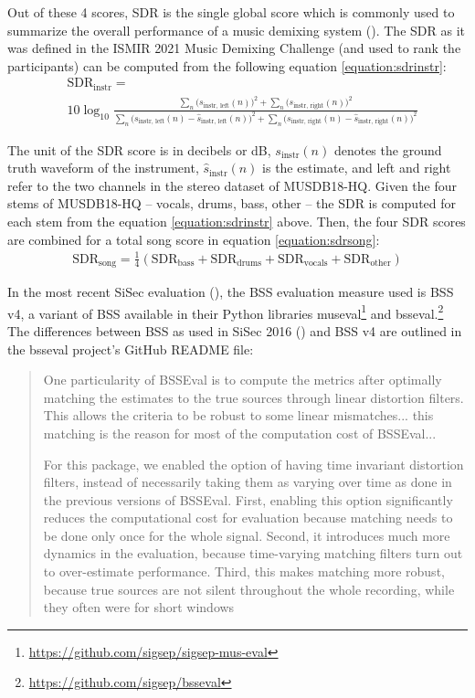 \documentclass[report.tex]{subfiles}
\begin{document}
Out of these 4 scores, SDR is the single global score which is commonly used to summarize the overall performance of a music demixing system (\cite{sdruseful}). The SDR as it was defined in the ISMIR 2021 Music Demixing Challenge (and used to rank the participants) can be computed from the following equation \ref{equation:sdrinstr}:
\begin{align}
	\nonumber & \text{SDR}_{\text{instr}} = \\
	&10 \log_{10}\frac{\sum_{n}\big(s_{\text{instr, left}}(n)\big)^{2} + \sum_{n}\big(s_{\text{instr, right}}(n)\big)^{2}}{\sum_{n}\big(s_{\text{instr, left}}(n) - \hat{s}_{\text{instr, left}}(n)\big)^{2} + \sum_{n}\big(s_{\text{instr, right}}(n) - \hat{s}_{\text{instr, right}}(n)\big)^{2}} \tag{10}\label{equation:sdrinstr}
\end{align}

The unit of the SDR score is in decibels or dB, $s_{\text{instr}}(n)$ denotes the ground truth waveform of the instrument, $\hat{s}_{\text{instr}}(n)$ is the estimate, and left and right refer to the two channels in the stereo dataset of MUSDB18-HQ. Given the four stems of MUSDB18-HQ -- vocals, drums, bass, other -- the SDR is computed for each stem from the equation \ref{equation:sdrinstr} above. Then, the four SDR scores are combined for a total song score in equation \ref{equation:sdrsong}:
\begin{align}
	\text{SDR}_{\text{song}} = \frac{1}{4}(\text{SDR}_{\text{bass}} + \text{SDR}_{\text{drums}} + \text{SDR}_{\text{vocals}} + \text{SDR}_{\text{other}}) \tag{11}\label{equation:sdrsong}
\end{align}

In the most recent SiSec evaluation (\cite{sisec2018}), the BSS evaluation measure used is BSS v4, a variant of BSS available in their Python libraries museval\footnote{\url{https://github.com/sigsep/sigsep-mus-eval}} and bsseval.\footnote{\url{https://github.com/sigsep/bsseval}} The differences between BSS as used in SiSec 2016 (\cite{sisec2016}) and BSS v4 are outlined in the bsseval project's GitHub README file:

\begin{quote}
	One particularity of BSSEval is to compute the metrics after optimally matching the estimates to the true sources through linear distortion filters. This allows the criteria to be robust to some linear mismatches... this matching is the reason for most of the computation cost of BSSEval...

	For this package, we enabled the option of having time invariant distortion filters, instead of necessarily taking them as varying over time as done in the previous versions of BSSEval. First, enabling this option significantly reduces the computational cost for evaluation because matching needs to be done only once for the whole signal. Second, it introduces much more dynamics in the evaluation, because time-varying matching filters turn out to over-estimate performance. Third, this makes matching more robust, because true sources are not silent throughout the whole recording, while they often were for short windows
\end{quote}
\end{document}
